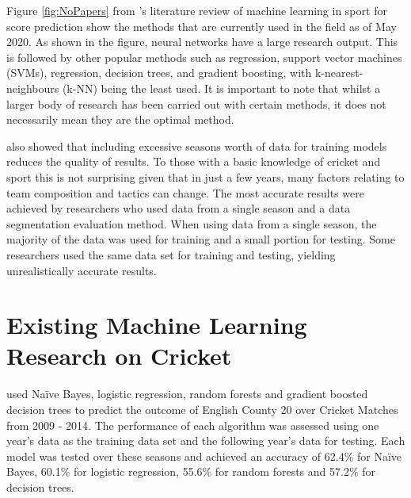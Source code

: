\documentclass[12pt,a4paper]{report}
\theoremstyle{definition}
\begin{document}
Figure \ref{fig:NoPapers} from \citet{horvat2020}'s literature review of machine learning in sport for score prediction show the methods that are currently used in the field as of May 2020. 
As shown in the figure, neural networks have a large research output.
This is followed by other popular methods such as regression, support vector machines (SVMs), regression, decision trees, and gradient boosting, with k-nearest-neighbours (k-NN) being the least used. 
It is important to note that whilst a larger body of research has been carried out with certain methods, it does not necessarily mean they are the optimal method.

\citet{horvat2020} also showed that including excessive seasons worth of data for training models reduces the quality of results. 
To those with a basic knowledge of cricket and sport this is not surprising given that in just a few years, many factors relating to team composition and tactics can change. 
The most accurate results were achieved by researchers who used data from a single season and a data segmentation evaluation method. 
When using data from a single season, the majority of the data was used for training and a small portion for testing. 
Some researchers used the same data set for training and testing, yielding unrealistically accurate results.

\section{Existing Machine Learning Research on Cricket} \label{sec:CrickSurvey}

\citet{KampakisStylianos2015} used Naïve Bayes, logistic regression, random forests and gradient boosted decision trees to predict the outcome of English County 20 over Cricket Matches from 2009 - 2014. 
The performance of each algorithm was assessed using one year's data as the training data set and the following year's data for testing. 
Each model was tested over these seasons and achieved an accuracy of 62.4\% for Naïve Bayes, 60.1\% for logistic regression, 55.6\% for random forests and 57.2\% for decision trees.
\end{document}
